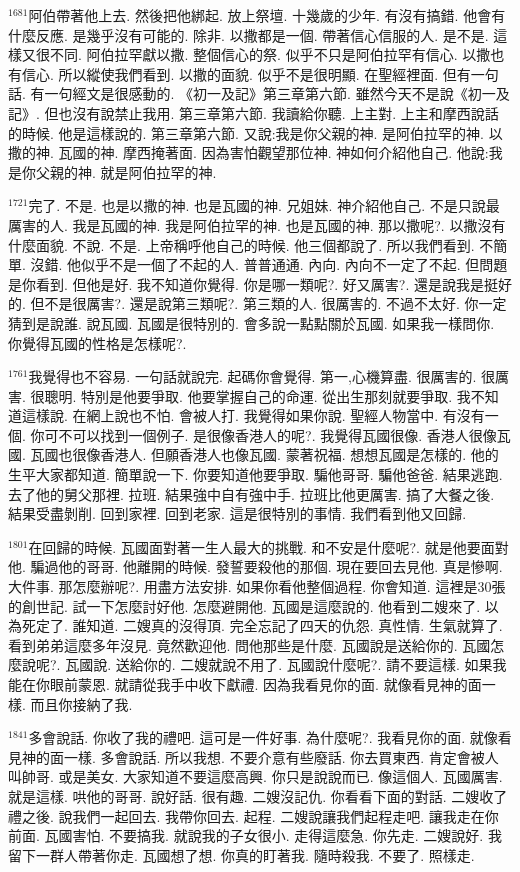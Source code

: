 \documentclass{book}
\begin{document}
$^{1681}$阿伯帶著他上去.
然後把他綁起.
放上祭壇.
十幾歲的少年.
有沒有搞錯.
他會有什麼反應.
是幾乎沒有可能的.
除非.
以撒都是一個.
帶著信心信服的人.
是不是.
這樣又很不同.
阿伯拉罕獻以撒.
整個信心的祭.
似乎不只是阿伯拉罕有信心.
以撒也有信心.
所以縱使我們看到.
以撒的面貌.
似乎不是很明顯.
在聖經裡面.
但有一句話.
有一句經文是很感動的.
《初一及記》第三章第六節.
雖然今天不是說《初一及記》.
但也沒有說禁止我用.
第三章第六節.
我讀給你聽.
上主對.
上主和摩西說話的時候.
他是這樣說的.
第三章第六節.
又說:我是你父親的神.
是阿伯拉罕的神.
以撒的神.
瓦國的神.
摩西掩著面.
因為害怕觀望那位神.
神如何介紹他自己.
他說:我是你父親的神.
就是阿伯拉罕的神.

$^{1721}$完了.
不是.
也是以撒的神.
也是瓦國的神.
兄姐妹.
神介紹他自己.
不是只說最厲害的人.
我是瓦國的神.
我是阿伯拉罕的神.
也是瓦國的神.
那以撒呢?.
以撒沒有什麼面貌.
不說.
不是.
上帝稱呼他自己的時候.
他三個都說了.
所以我們看到.
不簡單.
沒錯.
他似乎不是一個了不起的人.
普普通通.
內向.
內向不一定了不起.
但問題是你看到.
但他是好.
我不知道你覺得.
你是哪一類呢?.
好又厲害?.
還是說我是挺好的.
但不是很厲害?.
還是說第三類呢?.
第三類的人.
很厲害的.
不過不太好.
你一定猜到是說誰.
說瓦國.
瓦國是很特別的.
會多說一點點關於瓦國.
如果我一樣問你.
你覺得瓦國的性格是怎樣呢?.

$^{1761}$我覺得也不容易.
一句話就說完.
起碼你會覺得.
第一,心機算盡.
很厲害的.
很厲害.
很聰明.
特別是他要爭取.
他要掌握自己的命運.
從出生那刻就要爭取.
我不知道這樣說.
在網上說也不怕.
會被人打.
我覺得如果你說.
聖經人物當中.
有沒有一個.
你可不可以找到一個例子.
是很像香港人的呢?.
我覺得瓦國很像.
香港人很像瓦國.
瓦國也很像香港人.
但願香港人也像瓦國.
蒙著祝福.
想想瓦國是怎樣的.
他的生平大家都知道.
簡單說一下.
你要知道他要爭取.
騙他哥哥.
騙他爸爸.
結果逃跑.
去了他的舅父那裡.
拉班.
結果強中自有強中手.
拉班比他更厲害.
搞了大餐之後.
結果受盡剝削.
回到家裡.
回到老家.
這是很特別的事情.
我們看到他又回歸.

$^{1801}$在回歸的時候.
瓦國面對著一生人最大的挑戰.
和不安是什麼呢?.
就是他要面對他.
騙過他的哥哥.
他離開的時候.
發誓要殺他的那個.
現在要回去見他.
真是慘啊.
大件事.
那怎麼辦呢?.
用盡方法安排.
如果你看他整個過程.
你會知道.
這裡是30張的創世記.
試一下怎麼討好他.
怎麼避開他.
瓦國是這麼說的.
他看到二嫂來了.
以為死定了.
誰知道.
二嫂真的沒得頂.
完全忘記了四天的仇怨.
真性情.
生氣就算了.
看到弟弟這麼多年沒見.
竟然歡迎他.
問他那些是什麼.
瓦國說是送給你的.
瓦國怎麼說呢?.
瓦國說.
送給你的.
二嫂就說不用了.
瓦國說什麼呢?.
請不要這樣.
如果我能在你眼前蒙恩.
就請從我手中收下獻禮.
因為我看見你的面.
就像看見神的面一樣.
而且你接納了我.

$^{1841}$多會說話.
你收了我的禮吧.
這可是一件好事.
為什麼呢?.
我看見你的面.
就像看見神的面一樣.
多會說話.
所以我想.
不要介意有些廢話.
你去買東西.
肯定會被人叫帥哥.
或是美女.
大家知道不要這麼高興.
你只是說說而已.
像這個人.
瓦國厲害.
就是這樣.
哄他的哥哥.
說好話.
很有趣.
二嫂沒記仇.
你看看下面的對話.
二嫂收了禮之後.
說我們一起回去.
我帶你回去.
起程.
二嫂說讓我們起程走吧.
讓我走在你前面.
瓦國害怕.
不要搞我.
就說我的子女很小.
走得這麼急.
你先走.
二嫂說好.
我留下一群人帶著你走.
瓦國想了想.
你真的盯著我.
隨時殺我.
不要了.
照樣走.
\end{document}
